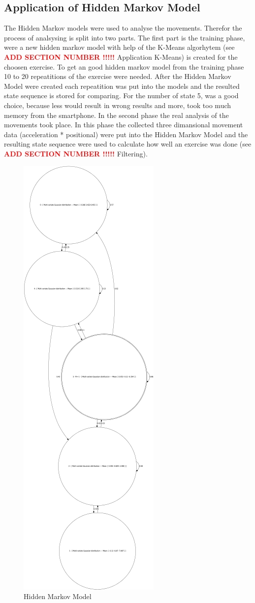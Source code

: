 \subsection{Application of Hidden Markov Model}

The Hidden Markov models were used to analyse the movements. Therefor the process of analsysing is split into two parts. The first part is the training phase, were a new hidden markov model with help of the K-Means algorhytem (see  \textcolor{red}{\textbf{ ADD SECTION NUMBER !!!!!}} Application K-Means) is created for the choosen exercise. To get an good hidden markov model from the training phase 10 to 20 repeatitions of the exercise were needed. After the Hidden Markov Model were created each repeatition was put into the models and the resulted state sequence is stored for comparing. For the number of state 5, was a good choice, because less would result in wrong results and more, took too much memory from the smartphone. In the second phase the real analysis of the movements took place. In this phase the collected three dimansional movement data (acceleration * positional) were put into the Hidden Markov Model and the resulting state sequence were used to calculate how well an exercise was done (see \textcolor{red}{\textbf{ ADD SECTION NUMBER !!!!!}} Filtering).
\begin{figure}[htp]
\centering
\includegraphics[scale=1.00]{00_resources/figures/output.png}
\caption{Hidden Markov Model}
\label{}
\end{figure}





